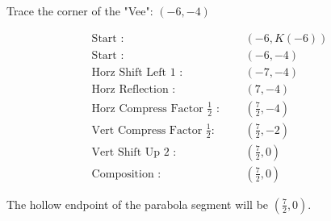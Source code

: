 \documentclass{ximera}
\begin{document}
\begin{question} 



Trace the corner of the "Vee": $(-6, -4)$





\begin{align*}
\text{Start :} & \text{  } & (-6, K(-6))  \\
\text{Start :} & \text{  } & (-6, -4) \\
\text{Horz Shift Left $1$ :} & \text{  } & \left( -7, -4 \right)   \\
\text{Horz Reflection :} & \text{  } & \left( 7, -4 \right)   \\
\text{Horz Compress Factor $\tfrac{1}{2}$ :}  & \text{  } & \left( \frac{7}{2}, -4 \right)   \\
\text{Vert Compress Factor $\tfrac{1}{2}$:} & \text{  } & \left( \frac{7}{2}, -2 \right)   \\
\text{Vert Shift Up $2$ :} & \text{  } & \left( \frac{7}{2}, 0 \right)   \\
\text{Composition :} & \text{  } & \left( \frac{7}{2}, 0 \right)   
\end{align*}


The hollow endpoint of the parabola segment will be $\left( \frac{7}{2}, 0 \right)$.

\end{question}
\end{document}

